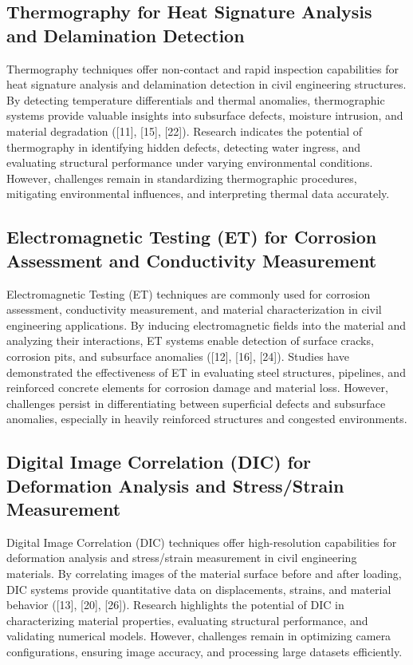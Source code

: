 \documentclass[journal, a4paper]{IEEEtran}
\begin{document}
\subsection{Thermography for Heat Signature Analysis and Delamination Detection}
Thermography techniques offer non-contact and rapid inspection capabilities for heat
signature analysis and delamination detection in civil engineering structures.
By detecting temperature differentials and thermal anomalies, thermographic systems provide valuable
insights into subsurface defects, moisture intrusion, and material degradation ([11], [15], [22]).
Research indicates the potential of thermography in identifying hidden defects, detecting water ingress,
and evaluating structural performance under varying environmental conditions.
However, challenges remain in standardizing thermographic procedures, mitigating environmental influences,
and interpreting thermal data accurately. 

\subsection{Electromagnetic Testing (ET) for Corrosion Assessment and Conductivity Measurement}
Electromagnetic Testing (ET) techniques are commonly used for corrosion assessment, conductivity measurement,
and material characterization in civil engineering applications. By inducing electromagnetic fields into the material
and analyzing their interactions, ET systems enable detection of surface cracks, corrosion pits, and subsurface anomalies
([12], [16], [24]). Studies have demonstrated the effectiveness of ET in evaluating steel structures, pipelines, and reinforced
concrete elements for corrosion damage and material loss. However, challenges persist in differentiating between superficial
defects and subsurface anomalies, especially in heavily reinforced structures and congested environments.

\subsection{Digital Image Correlation (DIC) for Deformation Analysis and Stress/Strain Measurement}
Digital Image Correlation (DIC) techniques offer high-resolution capabilities for deformation analysis and
stress/strain measurement in civil engineering materials. By correlating images of the material surface before
and after loading, DIC systems provide quantitative data on displacements, strains, and material behavior ([13], [20], [26]).
Research highlights the potential of DIC in characterizing material properties, evaluating structural performance,
and validating numerical models. However, challenges remain in optimizing camera configurations, ensuring image accuracy,
and processing large datasets efficiently. 
\end{document}

